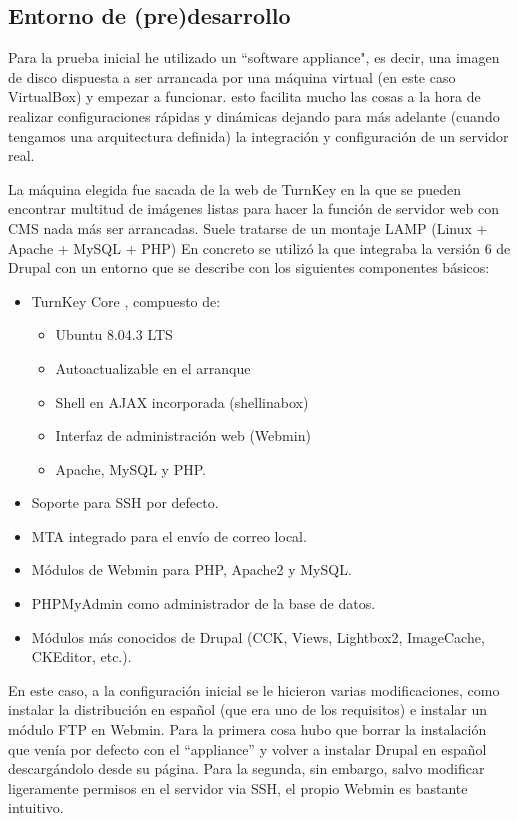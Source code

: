 \subsection{Entorno de (pre)desarrollo}
\par Para la prueba inicial he utilizado un ``software appliance", es decir, una imagen de disco dispuesta a ser arrancada por una máquina virtual (en este caso VirtualBox) y empezar a funcionar. esto facilita mucho las cosas a la hora de realizar configuraciones rápidas y dinámicas dejando para más adelante (cuando tengamos una arquitectura definida) la integración y configuración de un servidor real.

La máquina elegida fue sacada de la web de TurnKey \cite{references:turnkey} en la que se pueden encontrar multitud de imágenes listas para hacer la función de servidor web con CMS nada más ser arrancadas. Suele tratarse de un montaje LAMP (Linux + Apache + MySQL + PHP) \cite{references:LAMP} En concreto se utilizó la que integraba la versión 6 de Drupal \cite{references:turnkeydrupal} con un entorno que se describe con los siguientes componentes básicos:

\begin{itemize}
\item TurnKey Core \cite{references:turnkeycore}, compuesto de:
	\begin{itemize}
	\item Ubuntu 8.04.3 LTS
	\item Autoactualizable en el arranque
	\item Shell en AJAX incorporada (shellinabox\cite{references:shellinabox})
	\item Interfaz de administración web (Webmin\cite{references:webmin})
	\item Apache, MySQL y PHP.
	\end{itemize}
\item Soporte para SSH por defecto.
\item MTA integrado para el envío de correo local.
\item Módulos de Webmin para PHP, Apache2 y MySQL.
\item PHPMyAdmin como administrador de la base de datos.
\item Módulos más conocidos de Drupal (CCK, Views, Lightbox2, ImageCache, CKEditor, etc.).
\end{itemize}

\par En este caso, a la configuración inicial se le hicieron varias modificaciones, como instalar la distribución en español (que era uno de los requisitos) e instalar un módulo FTP en Webmin. Para la primera cosa hubo que borrar la instalación que venía por defecto con el ``appliance'' y volver a instalar Drupal en español descargándolo desde su página\cite{references:drupalhispano}. Para la segunda, sin embargo, salvo modificar ligeramente permisos en el servidor via SSH, el propio Webmin es bastante intuitivo.

